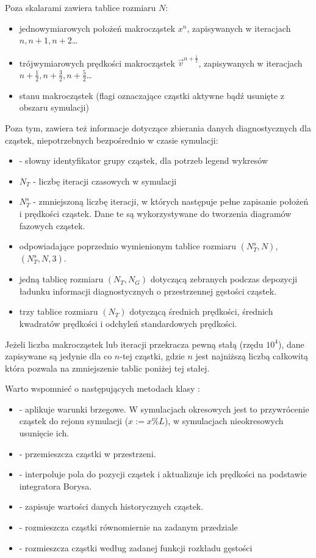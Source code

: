 Poza skalarami zawiera tablice rozmiaru $N$:
\begin{itemize}
    \item jednowymiarowych położeń makrocząstek $x^n$, zapisywanych w
        iteracjach $n, n+1, n+2$\ldots
    \item trójwymiarowych prędkości makrocząstek $\vec{v}^{n+\frac{1}{2}}$,
        zapisywanych w iteracjach $n+\frac{1}{2}, n+\frac{3}{2}, n+\frac{5}{2}$\ldots
    \item stanu makrocząstek (flagi oznaczające cząstki aktywne
        bądź usunięte z obszaru symulacji)
\end{itemize}

Poza tym, zawiera też informacje dotyczące zbierania danych diagnostycznych
dla cząstek, niepotrzebnych bezpośrednio w czasie symulacji:
\begin{itemize}
    \item {} - słowny identyfikator grupy cząstek, dla potrzeb legend wykresów
    \item $N_T$ - liczbę iteracji czasowych w symulacji
    \item $N_T^s$ - zmniejszoną liczbę iteracji, w których następuje pełne
        zapisanie położeń i prędkości cząstek.  Dane te są wykorzystywane
        do tworzenia diagramów fazowych cząstek.
    \item odpowiadające poprzednio wymienionym tablice rozmiaru $(N_T^s,
        N)$, $(N_T^s, N, 3)$.  \item jedną tablicę rozmiaru $(N_T, N_G)$
        dotyczącą zebranych podczas
        depozycji ładunku informacji diagnostycznych o przestrzennej
        gęstości cząstek.
    \item trzy tablice rozmiaru $(N_T)$ dotyczącą średnich prędkości,
        średnich kwadratów prędkości i odchyleń standardowych prędkości.
\end{itemize}

Jeżeli liczba makrocząstek lub iteracji przekracza pewną stałą (rzędu $10^4$), dane zapisywane są jedynie dla co $n$-tej cząstki,
gdzie $n$ jest najniższą liczbą całkowitą która pozwala na zmniejszenie tablic poniżej tej stałej.

Warto wspomnieć o następujących metodach klasy :
\begin{itemize}
    \item {} - aplikuje warunki brzegowe. W symulacjach okresowych jest to przywrócenie cząstek do rejonu symulacji ($x := x \% L$), w symulacjach nieokresowych usunięcie ich.
    \item {}  - przemieszcza cząstki w przestrzeni.
    \item {} - interpoluje pola do pozycji cząstek i aktualizuje ich prędkości na podstawie integratora Borysa.
    \item {} - zapisuje wartości danych historycznych cząstek.
    \item {} - rozmieszcza cząstki równomiernie na zadanym przedziale
    \item {} - rozmieszcza cząstki według zadanej funkcji rozkładu gęstości
\end{itemize}


